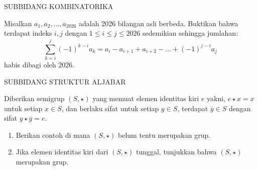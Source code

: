 \documentclass{article}
\begin{document}
\vspace{0.5cm}

\begin{center}
  SUBBIDANG KOMBINATORIKA
\end{center}

Misalkan $a_1, a_2, \dots, a_{2026}$ adalah 2026 bilangan asli berbeda. Buktikan bahwa terdapat indeks $i, j$ dengan $1 \le i \le j \le 2026$ sedemikian sehingga jumlahan:
\[
  \sum_{k=i}^j (-1)^{k-i} a_k = a_i - a_{i+1} + a_{i+2} - \dots + (-1)^{j-i} a_j
\]
habis dibagi oleh $2026$.

\vspace{0.5cm}

\begin{center}
  SUBBIDANG STRUKTUR ALJABAR
\end{center}

Diberikan semigrup $(S, \star)$ yang memuat elemen identitas kiri $e$ yakni, $e \star x = x$ untuk setiap $x \in S$, dan berlaku sifat untuk setiap $y \in S$, terdapat $\bar{y} \in S$ dengan sifat $y \star \bar{y} = e$.
\begin{enumerate}
  \item[(a)] Berikan contoh di mana $(S, \star)$ belum tentu merupakan grup.
  \item[(b)] Jika elemen identitas kiri dari $(S, \star)$ tunggal, tunjukkan bahwa $(S, \star)$ merupakan grup.
\end{enumerate}
\end{document}
